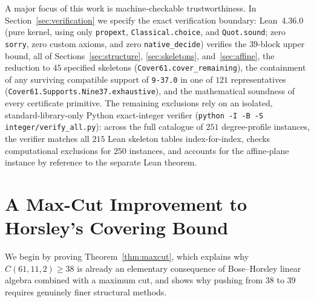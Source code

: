 \documentclass[11pt,a4paper]{article}
\theoremstyle{definition}
\theoremstyle{remark}
\begin{document}
A major focus of this work is machine-checkable trustworthiness. In Section~\ref{sec:verification} we specify the exact verification boundary: Lean~4.36.0 (pure kernel, using only \texttt{propext}, \texttt{Classical.choice}, and \texttt{Quot.sound}; zero \texttt{sorry}, zero custom axioms, and zero \texttt{native\_decide}) verifies the $39$-block upper bound, all of Sections~\ref{sec:structure}, \ref{sec:skeletons}, and~\ref{sec:affine}, the reduction to $45$ specified skeletons (\texttt{Cover61.cover\_remaining}), the containment of any surviving compatible support of \texttt{9-37.0} in one of $121$ representatives (\texttt{Cover61.Supports.Nine37.exhaustive}), and the mathematical soundness of every certificate primitive. The remaining exclusions rely on an isolated, standard-library-only Python exact-integer verifier (\texttt{python -I -B -S integer/verify\_all.py}): across the full catalogue of $251$ degree-profile instances, the verifier matches all $215$ Lean skeleton tables index-for-index, checks computational exclusions for $250$ instances, and accounts for the affine-plane instance by reference to the separate Lean theorem.

\section{A Max-Cut Improvement to Horsley's Covering Bound}\label{sec:maxcut}

We begin by proving Theorem~\ref{thm:maxcut}, which explains why $C(61,11,2) \ge 38$ is already an elementary consequence of Bose--Horsley linear algebra combined with a maximum cut, and shows why pushing from $38$ to $39$ requires genuinely finer structural methods.
\end{document}
